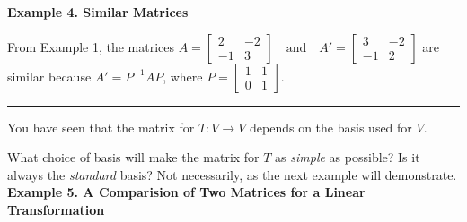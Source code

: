 \documentclass{article}
\newcounter{example}[section]
\begin{document}
    \textbf{Example 4. \textcolor{blue5}{Similar Matrices}}

    From Example 1, the matrices
    $A = \begin{bmatrix}
        2 & -2 \\
        -1 & 3
    \end{bmatrix} \quad \text{and} \quad
    A' = \begin{bmatrix}
        3 & -2\\
        -1 & 2
    \end{bmatrix} $
    are similar because $A' = P^{-1}AP$, where $P = \begin{bmatrix}
        1 & 1 \\
        0 & 1
    \end{bmatrix}$.

    {\color{blue9} \rule{7cm}{0.3mm}}

    You have seen that the matrix for $T: V \to  V$ depends on the basis used for $V$. 

    What choice of basis will make the matrix for $T$ as \textit{simple} as possible? Is it always
    the \textit{standard} basis? Not necessarily, as the next example will demonstrate.\\
    \textbf{Example 5. \textcolor{blue5}{A Comparision of Two Matrices for a Linear Transformation}}
\end{document}
